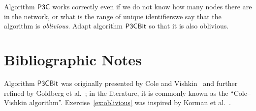 \begin{exs}\label{ex:oblivious}
    Algorithm $\textsf{P3C}$ works correctly even if we do not know how many nodes there are in the network, or what is the range of unique identifiers\mydash we say that the algorithm is \emph{oblivious}. Adapt algorithm $\textsf{P3CBit}$ so that it is also oblivious.
\end{exs}


\section{Bibliographic Notes}

Algorithm $\textsf{P3CBit}$ was originally presented by Cole and Vishkin~\cite{cole86deterministic} and further refined by Goldberg et al.~\cite{goldberg88parallel}; in the literature, it is commonly known as the ``Cole--Vishkin algorithm''. Exercise~\ref{ex:oblivious} was inspired by Korman et al.~\cite{korman11removing}.
